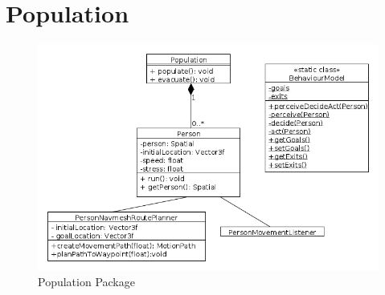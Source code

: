 %

\section{Population}

\begin{figure}[here]
\centering
\includegraphics[scale = 0.5]{../UMLDiagrams/PopulationModel.png}
\caption{Population Package}
\label{fig:populationmodel}
\end{figure}


